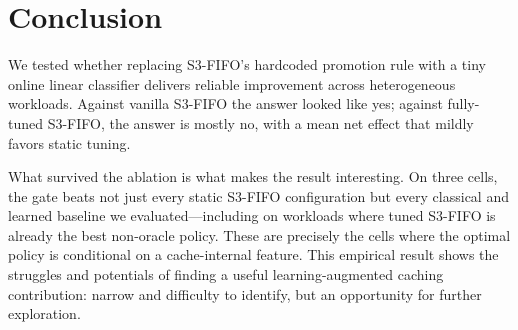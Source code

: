 \documentclass[letterpaper,twocolumn,10pt]{article}
\begin{document}
\section{Conclusion}

We tested whether replacing S3-FIFO's hardcoded promotion rule with
a tiny online linear classifier delivers reliable improvement
across heterogeneous workloads. Against vanilla S3-FIFO the answer
looked like yes; against fully-tuned S3-FIFO, the answer is mostly no, with a
mean net effect that mildly favors static tuning.

What survived the ablation is what makes the result interesting.
On three cells, the gate beats not just every static S3-FIFO
configuration but every classical and learned baseline we
evaluated---including on workloads where tuned S3-FIFO is already
the best non-oracle policy. These are precisely the cells where
the optimal policy is conditional on a cache-internal feature. This empirical result shows the struggles and potentials of finding a useful learning-augmented caching
contribution: narrow and difficulty to identify, but an opportunity for further exploration. 
 
 
 
 
\end{document}
